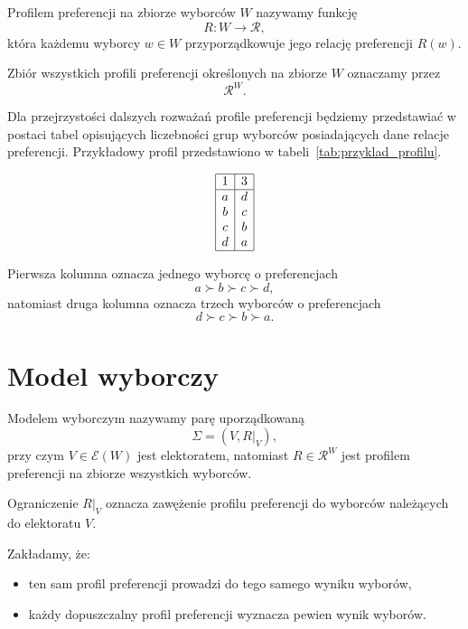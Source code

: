 \documentclass[12pt,a4paper]{mwrep}
\begin{document}
	\begin{definition}
		\label{def:profil-preferencji}
		Profilem preferencji na zbiorze wyborców \(W\) nazywamy funkcję
		\[
		R : W \to \mathcal{R},
		\]
		która każdemu wyborcy \(w \in W\) przyporządkowuje jego relację preferencji \(R(w)\).
	\end{definition}
	
	Zbiór wszystkich profili preferencji określonych na zbiorze \(W\) oznaczamy przez
	\[
	\mathcal{R}^{W}.
	\]
	
	Dla przejrzystości dalszych rozważań profile preferencji będziemy przedstawiać w postaci tabel opisujących liczebności grup wyborców posiadających dane relacje preferencji. Przykładowy profil przedstawiono w tabeli~\ref{tab:przyklad_profilu}.
	
	\begin{table}[H]
		\centering
		\[
		\begin{array}{|c|c|}
			\hline
			1 & 3\\
			\hline
			a & d\\
			b & c\\
			c & b\\
			d & a\\
			\hline
		\end{array}
		\]
		\caption{Przykładowy profil preferencji}
		\label{tab:przyklad_profilu}
	\end{table}
	
	Pierwsza kolumna oznacza jednego wyborcę o preferencjach
	\[
	a \succ b \succ c \succ d,
	\]
	natomiast druga kolumna oznacza trzech wyborców o preferencjach
	\[
	d \succ c \succ b \succ a.
	\]
	
	\section{Model wyborczy}
	
	\begin{definition}
		\label{def:model-wyborczy}
		Modelem wyborczym nazywamy parę uporządkowaną
		\[
		\Sigma = (V, R|_V),
		\]
		przy czym \(V \in \mathcal{E}(W)\) jest elektoratem, natomiast \(R \in \mathcal{R}^{W}\) jest profilem preferencji na zbiorze wszystkich wyborców.
		
		Ograniczenie \(R|_V\) oznacza zawężenie profilu preferencji do wyborców należących do elektoratu \(V\).
	\end{definition}
	
	Zakładamy, że:
	\begin{itemize}
		\item ten sam profil preferencji prowadzi do tego samego wyniku wyborów,
		\item każdy dopuszczalny profil preferencji wyznacza pewien wynik wyborów.
	\end{itemize}
	
\end{document}
